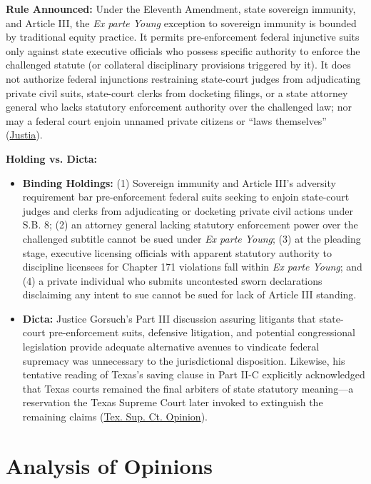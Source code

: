 \documentclass[12pt]{article}
\begin{document}
\textbf{Rule Announced:} Under the Eleventh Amendment, state sovereign immunity, and Article III, the \textit{Ex parte Young} exception to sovereign immunity is bounded by traditional equity practice. It permits pre-enforcement federal injunctive suits only against state executive officials who possess specific authority to enforce the challenged statute (or collateral disciplinary provisions triggered by it). It does not authorize federal injunctions restraining state-court judges from adjudicating private civil suits, state-court clerks from docketing filings, or a state attorney general who lacks statutory enforcement authority over the challenged law; nor may a federal court enjoin unnamed private citizens or ``laws themselves'' (\href{https://supreme.justia.com/cases/federal/us/595/21-463/}{Justia}).

\textbf{Holding vs. Dicta:}
\begin{itemize}
    \item \textbf{Binding Holdings:} (1) Sovereign immunity and Article III's adversity requirement bar pre-enforcement federal suits seeking to enjoin state-court judges and clerks from adjudicating or docketing private civil actions under S.B. 8; (2) an attorney general lacking statutory enforcement power over the challenged subtitle cannot be sued under \textit{Ex parte Young}; (3) at the pleading stage, executive licensing officials with apparent statutory authority to discipline licensees for Chapter 171 violations fall within \textit{Ex parte Young}; and (4) a private individual who submits uncontested sworn declarations disclaiming any intent to sue cannot be sued for lack of Article III standing.
    \item \textbf{Dicta:} Justice Gorsuch's Part III discussion assuring litigants that state-court pre-enforcement suits, defensive litigation, and potential congressional legislation provide adequate alternative avenues to vindicate federal supremacy was unnecessary to the jurisdictional disposition. Likewise, his tentative reading of Texas's saving clause in Part II-C explicitly acknowledged that Texas courts remained the final arbiters of state statutory meaning---a reservation the Texas Supreme Court later invoked to extinguish the remaining claims (\href{https://www.txcourts.gov/media/1453763/220033.pdf}{Tex. Sup. Ct. Opinion}).
\end{itemize}

\section{Analysis of Opinions}
\end{document}

